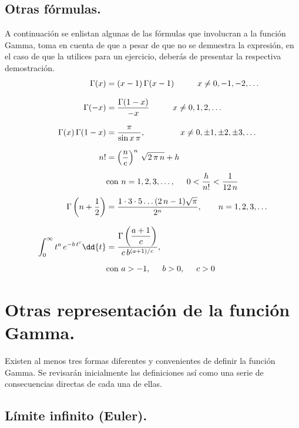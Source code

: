 \subsection{Otras fórmulas.}

A continuación se enlistan algunas de las fórmulas que involucran a la función Gamma, toma en cuenta de que a pesar de que no se demuestra la expresión, en el caso de que la utilices para un ejercicio, deberás de presentar la respectiva demostración.
{%
\begin{align*}
\Gamma (x) &= (x - 1) \, \Gamma(x - 1) \hspace{1cm} x \neq 0, -1, -2, \ldots \\[0.75em]
\Gamma (-x) &= \dfrac{\Gamma (1- x)}{-x} \hspace{1cm} x \neq 0, 1, 2, \ldots \\[0.75em]
\Gamma (x) \, \Gamma (1 - x) &= \dfrac{\pi}{\sin x \, \pi}, \hspace{1.5cm} x \neq 0, \pm 1, \pm 2, \pm 3, \ldots \\[0.75em]
n! &= \left( \dfrac{n}{e} \right)^{n} \, \sqrt{2 \, \pi \, n} + h \\[0.5em]
&\mbox{con } n = 1, 2, 3, \ldots, \hspace{0.5cm} 0 < \dfrac{h}{n!} < \dfrac{1}{12 \, n} \\[0.5em]
\Gamma \left(n + \dfrac{1}{2} \right) &= \dfrac{1 \cdot 3 \cdot 5 \ldots (2 \, n - 1)\sqrt{\pi}}{2^{n}}, \hspace{0.7cm} n = 1, 2, 3, \ldots \\[0.75em]
\int_{0}^{\infty} t^{a} \, e^{-b \, t^{c}} \dd{t} &= \dfrac{\Gamma \left(\dfrac{a + 1}{c} \right)}{c \, b^{(a+1)/c}}, \\[0.5em]
&\mbox{con } a > -1, \hspace{0.5cm} b > 0, \hspace{0.5cm} c > 0   
\end{align*}
}

\section{Otras representación de la función Gamma.} \label{seccion:otras_respresentaciones}

Existen al menos tres formas diferentes y convenientes de definir la función Gamma. Se revisarán inicialmente las definiciones así como una serie de consecuencias directas de cada una de ellas.

\subsection{Límite infinito (Euler).}

